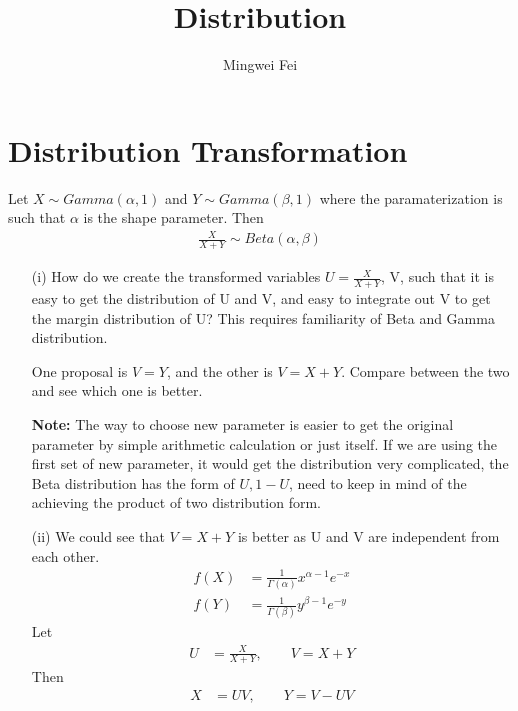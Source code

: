\documentclass[11pt]{article} %
\title{Distribution}
\author{Mingwei Fei}
\begin{document}
\maketitle

\section{Distribution Transformation}
Let $X \sim Gamma(\alpha, 1)$ and $Y \sim Gamma(\beta, 1)$ where the paramaterization is such that $\alpha$ is the shape parameter. Then 
\begin{align*}
	\frac{X}{X+Y} \sim Beta(\alpha, \beta)
\end{align*}

\begin{itemize}
	\item [(i)] How do we create the transformed variables $U= \frac{X}{X+Y} $, V, such that it is easy to get the distribution of U and V, and easy to integrate out V to get the margin distribution of U? This requires familiarity of Beta and Gamma distribution.
	
	One proposal is $V= Y$, and the other is $V= X+Y$. Compare between the two and see which one is better.
	
	\textbf{Note:} The way to choose new parameter is easier to get the original parameter by simple arithmetic calculation or just itself.
	If we are using the first set of new parameter, it would get the distribution very complicated, the Beta distribution has the form of $U, 1-U$, need to keep in mind of the achieving the product of two distribution form. 
	
	
	
	\item[(ii)] We could see that $V=X+Y$ is better as U and V are independent from each other.
\begin{align*}
	f(X) &= \frac{1}{\Gamma{(\alpha)}} x^{\alpha-1} e^{-x}\\
	f(Y) &= \frac{1}{\Gamma{(\beta)}} y^{\beta-1} e^{-y}
\end{align*}	
Let
\begin{align*}
	U &= \frac{X}{X+Y}, \qquad V = X + Y
\end{align*}	
Then
\begin{align*}
	X &= UV, \qquad Y = V - UV
\end{align*}
	 	

\end{itemize}
\end{document}
